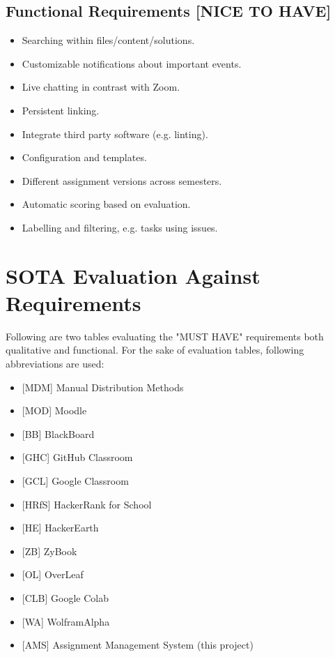 \subsection{Functional Requirements {[}NICE TO HAVE{]}} \label{ssec:func-nth}

\begin{itemize}
\item
  {Searching within files/content/solutions.}
\item
  {Customizable notifications about important events.}
\item
  {Live chatting in contrast with Zoom.}
\item
  {Persistent linking.}
\item
  {Integrate third party software (e.g. linting).}
\item
  {Configuration and templates.}
\item
  {Different assignment versions across semesters.}
\item
  {Automatic scoring based on evaluation.}
\item
  {Labelling and filtering, e.g. tasks using issues.}
\end{itemize}

\section{SOTA Evaluation Against Requirements} \label{sec:eval}

{Following are two tables evaluating the "MUST HAVE" requirements both qualitative and functional. For the sake of evaluation tables, following abbreviations are used:}

\begin{itemize}
\item
  {{[}MDM{]} Manual Distribution Methods}
\item
  {{[}MOD{]} Moodle}
\item
  {{[}BB{]} BlackBoard}
\item
  {{[}GHC{]} GitHub Classroom}
\item
  {{[}GCL{]} Google Classroom}
\item
  {{[}HRfS{]} HackerRank for School}
\item
  {{[}HE{]} HackerEarth}
\item
  {{[}ZB{]} ZyBook}
\item
  {{[}OL{]} OverLeaf}
\item
  {{[}CLB{]} Google Colab}
\item
  {{[}WA{]} WolframAlpha}
\item
  {{[}AMS{]} Assignment Management System (this project)}
\end{itemize}

